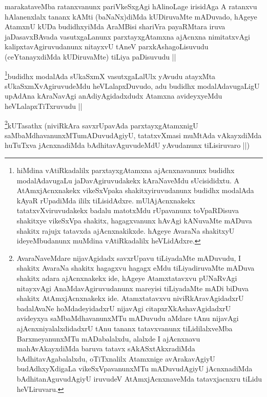 \begin{artha}
marakataveMba ratanxvanunx pariVkeSxgAgi hAlinoLage irisidAga A ratanxvu hAlanenxlalx tananx kAMti (baNaNx)diMda kUDiruvaMte mADuvado, hAgeye AtamxnU kUDa budidhxyiMda AraMBisi shariVra payaRMtara iruva jaDasavxBAvada vasutxgaLanunx parxtayxgAtamxna ajAcnxna nimitatxvAgi kalipxtavAgiruvudanunx nitayxvU tAneV parxkAshagoLisuvudu (ceYtanayxdiMda kUDiruvaMte) tiLiya paDisuvudu ||
\end{artha}

\begin{artha}
\footnote{hiMdina vAtiRkadalilx parxtayxgAtamxna ajAcnxnavanunx budidhx modalAdavugaLu jaDavAgiruvudakekx kAraNaveMdu sUcisididxtu. A AtAmxjAcnxnakekx vikeSxVpaka shakitxyiruvudanunx budidhx modalAda kAyaR rUpadiMda ililx tiLisidAdxre. mUlAjAcnxnakekx tatatxvXviruvudakekx badalu matotxMdu rUpavanunx toVpaRDisuva shakitxye vikeSxVpa shakitx, hagagxvanunx hAvAgi kANuvaMte mADuva shakitx rajujx tatavxda ajAcnxnakikxde. hAgeye AvaraNa shakitxyU ideyeMbudanunx muMdina vAtiRkadalilx heVLidAdxre.}budidhx modalAda sUkaSxmX vasutxgaLalUlx yAvudu atayxMta sUkaSxmXvAgiruvudeMdu heVLalapxDuvudo, adu budidhx modalAdavugaLigU upAdAna kAraNavAgi anAdiyAgidadxdudx Atamxna avideyxyeMdu heVLalapxTiTxruvudu ||
\end{artha}

\begin{artha}
\footnote{AvaraNaveMdare nijavAgidadx savxrUpavu tiLiyadaMte mADuvudu, I shakitx AvaraNa shakitx hagagxvu hagagx eMdu tiLiyadiruvaMte mADuva shakitx adara ajAcnxnakekx ide, hAgeye Atamxtatavxvu pUNaRvAgi nitayxvAgi AnaMdavAgiruvudanunx mareyisi tiLiyadaMte mADi biDuva shakitx AtAmxjAcnxnakekx ide. Atamxtatavxvu niviRkAravAgidadxrU badalAvaNe hoMdadeyidadxrU nijavAgi citapxrXkAshavAgidadxrU avideyxya saMbaMdhavanunxMTu mADuvudu aMdare tAnu nijavAgi ajAcnxniyalalxdidadxrU tAnu tananx tatavxvanunx tiLidilalxveMba BarxmeyanunxMTu mADabalalxdu, alalxde I ajAcnxnavu mahAvAkayxdiMda baruva tatavx sAkASxtAkxradiMda bAdhitavAgabalalxdu, oTiTxnalilx Atamxnige avArakavAgiyU budAdhxyXdigaLa vikeSxVpavanunxMTu mADuvudAgiyU jAcnxnadiMda bAdhitanAguvudAgiyU iruvudeV AtAmxjAcnxnaveMda tatavxjacnxru tiLidu heVLiruvaru.}kUTasathx (niviRkAra savxrUpavAda parxtayxgAtamxnigU saMbaMdhavanunxMTumADuvudAgiyU, tatatxvXmasi muMtAda vAkayxdiMda huTuTxva jAcnxnadiMda bAdhitavAguvudeMdU yAvudanunx tiLisiruvaro ||)
\end{artha}

